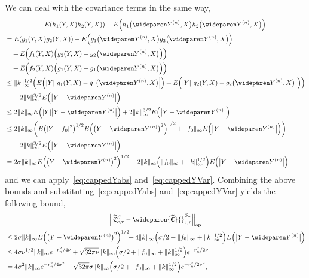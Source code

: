 \documentclass[AHL,Unicode,longabstracts,published]{cedram}
\theoremstyle{remark}
\DeclareMathOperator{\opp}{op}
\newcommand{\fkC}{\mathfrak{C}}
\newcommand{\Cov}{\tilde{\fkC}}
\newcommand{\CovCapntau}{\wideparen{\widetilde{\fkC}}{\vphantom{\fkC}}^{S_n}_{c,\tau}}
\let\oldtilde\tilde
\renewcommand*{\tilde}[1]{\mathchoice{\widetilde{#1}}{\widetilde{#1}}{\oldtilde{#1}}{\oldtilde{#1}}}
\let\originalleft\left
\let\originalright\right
\renewcommand{\left}{\mathopen{}\mathclose\bgroup\originalleft}
\renewcommand{\right}{\aftergroup\egroup\originalright}
\begin{document}
We can deal with the covariance terms in the same way,
\begin{multline*}
E(h_1(Y,X) h_2(Y,X)) - E\left(h_1\bigl(\wideparen Y^{(n)},X\bigr) h_2\bigl(\wideparen Y^{(n)},X\bigr)\right) \\
\begin{aligned}
&= E(g_1(Y,X) g_2(Y,X)) - E\left(g_1\bigl(\wideparen Y^{(n)},X\bigr) g_2\bigl(\wideparen Y^{(n)},X\bigr)\right) \\
&\quad + E\left(f_1(Y,X) \left(g_2(Y,X) - g_2\bigl(\wideparen Y^{(n)},X\bigr)\right)\right) \\
&\quad + E\left(f_2(Y,X) \left(g_1(Y,X) - g_1\bigl(\wideparen Y^{(n)},X\bigr)\right)\right) \\
& \leq \|k\|_\infty^{1/2} \left(E\left(|Y| \left|g_1(Y,X) - g_1\bigl(\wideparen Y^{(n)},X\bigr)\right|\right) + E\left(|Y| \left|g_2(Y,X) - g_2\bigl(\wideparen Y^{(n)},X\bigr)\right|\right)\right)
\\
&\quad + 2 \|k\|^{3/2}_\infty E\left(\bigl|Y - \wideparen Y^{(n)}\bigr|\right) \\
& \leq 2 \|k\|_\infty E\left(|Y| \bigl|Y - \wideparen Y^{(n)}\bigr|\right) + 2 \|k\|^{3/2}_\infty E\left(\bigl|Y - \wideparen Y^{(n)}\bigr|\right) \\
&\leq 2 \|k\|_\infty \left(E\left(|Y - f_0|^2\right)^{1/2} E\left(\bigl(Y - \wideparen Y^{(n)}\bigr)^2\right)^{1/2} + \|f_0\|_\infty E\left(\bigl|Y - \wideparen Y^{(n)}\bigr|\right)\right) \\
&\quad + 2 \|k\|^{3/2}_\infty E\left(\bigl|Y - \wideparen Y^{(n)}\bigr|\right) \\
&=2 \sigma \|k\|_\infty E\left(\bigl(Y - \wideparen Y^{(n)}\bigr)^2\right)^{1/2} + 2 \|k\|_\infty \left(\|f_0\|_\infty + \|k\|_\infty^{1/2}\right) E\left(\bigl|Y - \wideparen Y^{(n)}\bigr|\right)
\end{aligned}
\end{multline*}
and we can apply~\eqref{eq:cappedYabs} and~\eqref{eq:cappedYVar}. Combining the above bounds and substituting~\eqref{eq:cappedYabs} and~\eqref{eq:cappedYVar} yields the following bound,
\begin{multline}\label{eq:direct_sum_cov}
\left\|\Cov_{c,\tau}^S - \CovCapntau\right\|_{\opp}\\
\begin{aligned}
&\leq 2 \sigma \|k\|_\infty E\left(\bigl(Y - \wideparen Y^{(n)}\bigr)^2\right)^{1/2} \!\! + 4 \|k\|_\infty \left(\sigma/2 + \|f_0\|_\infty + \|k\|_\infty^{1/2}\right) E\left(\bigl|Y - \wideparen Y^{(n)}\bigr|\right)\\
&\leq 4 \sigma \nu^{1/2} \|k\|_\infty e^{-r_n^2/4\nu} + \sqrt{32\pi\nu} \|k\|_\infty \left(\sigma/2 + \|f_0\|_\infty + \|k\|_\infty^{1/2}\right) e^{-r_n^2/2\nu}\\
&= 4 \sigma^2 \|k\|_\infty e^{-r_n^2/4\sigma^2} + \sqrt{32\pi} \sigma \|k\|_\infty \left(\sigma/2 + \|f_0\|_\infty + \|k\|_\infty^{1/2}\right) e^{-r_n^2/2\sigma^2},
\end{aligned}
\end{multline}
\end{document}
